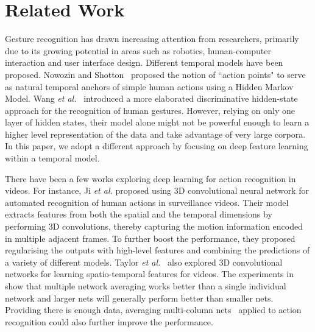 
\section{Related Work}
\label{sec:relatedwork}

Gesture recognition has drawn increasing attention from researchers, primarily due to its growing potential in areas such as robotics, human-computer interaction and user interface design. Different temporal models have been proposed.
Nowozin and Shotton~\cite{nowozin2012action} proposed the notion of ``action points" to serve as natural temporal anchors of simple human actions using a Hidden Markov Model.
Wang \emph{et al.}~\cite{wang2006hidden} introduced a more elaborated discriminative hidden-state approach for the recognition of human gestures.
However, relying on only one layer of hidden states,
their model alone might not  be powerful enough to learn a higher level representation of the data and take advantage of very large corpora. In this paper, we adopt a different approach by focusing on deep feature learning within a temporal model.

There have been a few works exploring deep learning for action recognition in videos. For instance, Ji \emph{et al.}\cite{ji20133d} proposed using 3D convolutional neural network for automated recognition of human actions in surveillance videos. Their model extracts features from both the spatial and the temporal dimensions by performing 3D convolutions, thereby capturing the motion information encoded in multiple adjacent frames. To further boost the performance, they proposed regularising the outputs with high-level features and combining the predictions of a variety of different models. Taylor \emph{et al.}~\cite{taylor2010convolutional}  also explored 3D convolutional networks for learning spatio-temporal features for videos. The experiments in~\cite{wu2014deep} show that multiple network averaging works better than a single individual network and larger nets  will generally perform better than smaller nets.
Providing there is enough data, averaging multi-column nets~\cite{ciresan2012multi} applied to
action recognition could also further improve the performance.

